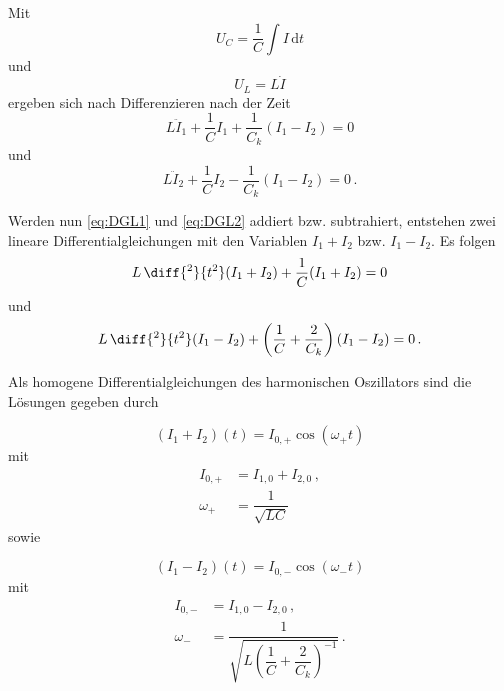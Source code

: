 Mit 
\begin{equation*}
    U_C = \dfrac{1}{C} \int I \, \text{d}t
\end{equation*}
und
\begin{equation*}
    U_L = L \dot{I}
\end{equation*}
ergeben sich nach Differenzieren nach der Zeit
\begin{equation}
    L\ddot{I}_1 + \dfrac{1}{C}I_1 + \dfrac{1}{C_k}(I_1 - I_2) = 0
    \label{eq:DGL1}
\end{equation}
und
\begin{equation}
    L\ddot{I}_2 + \dfrac{1}{C}I_2 - \dfrac{1}{C_k}(I_1 - I_2) = 0\,.
    \label{eq:DGL2}
\end{equation}

Werden nun \eqref{eq:DGL1} und \eqref{eq:DGL2} addiert bzw. subtrahiert, entstehen zwei lineare Differentialgleichungen mit den Variablen $I_1+I_2$ bzw. $I_1-I_2$.
Es folgen
\begin{equation}
    L \,\diff{^2}{t^2}(I_1+I_2) + \dfrac{1}{C}(I_1 + I_2) = 0
    \label{eq:addDGL}
\end{equation}
und
\begin{equation}
    L \,\diff{^2}{t^2}(I_1 - I_2) + \left(\dfrac{1}{C} + \dfrac{2}{C_k} \right)(I_1 - I_2) = 0\,.
\end{equation}

\newpage

Als homogene Differentialgleichungen des harmonischen Oszillators sind die Lösungen gegeben durch

\begin{equation}
    (I_1+I_2)(t) = I_{0,+} \cos(ω_+t)
    \label{eq:gleiSchwi}
\end{equation}
mit 
\begin{align}
    I_{0,+} &= I_{1,0}+I_{2,0}\, , \\
    ω_+     &=\dfrac{1}{\sqrt{LC}}
    \label{eq:w_+}
\end{align}
sowie

\begin{equation*}
    (I_1-I_2)(t) = I_{0,-}\cos(ω_-t)
    \label{eq:gegSchwi}
\end{equation*}
mit 
\begin{align}
    I_{0,-} &=I_{1,0} - I_{2,0}\,, \nonumber \\
    ω_-     &= \dfrac{1}{\sqrt{L \left(\dfrac{1}{C}+\dfrac{2}{C_k}\right)^{-1}}}\,.
    \label{eq:w_-}
\end{align} \\

